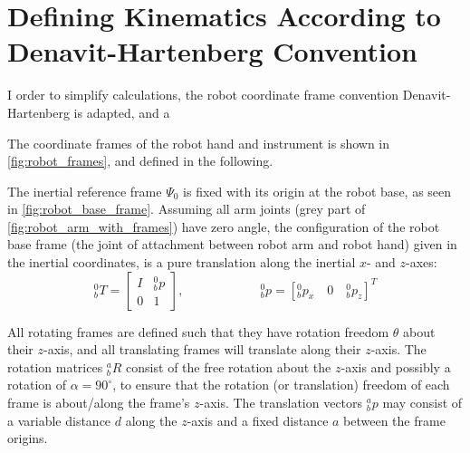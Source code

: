 \section{Defining Kinematics According to Denavit-Hartenberg Convention}

I order to simplify calculations, the robot coordinate frame convention Denavit-Hartenberg is adapted, and a 

The coordinate frames of the robot hand and instrument is shown in \autoref{fig:robot_frames}, and defined in the following.


The inertial reference frame $\Psi_0$ is fixed with its origin at the robot base, as seen in \autoref{fig:robot_base_frame}. Assuming all arm joints (grey part of \autoref{fig:robot_arm_with_frames}) have zero angle, the configuration of the robot base frame (the joint of attachment between robot arm and robot hand) given in the inertial coordinates, is a pure translation along the inertial $x$- and $z$-axes:
\begin{equation}
^0_b T = \begin{bmatrix}
I & ^0_bp\\
0 & 1
\end{bmatrix}, 
\qquad\qquad\qquad
^0_bp = [^0_bp_x \quad 0 \quad ^0_bp_z]^T
\end{equation}

All rotating frames are defined such that they have rotation freedom $\theta$ about their $z$-axis, and all translating frames will translate along their $z$-axis. The rotation matrices $^a_bR$ consist of the free rotation about the $z$-axis and possibly a rotation of $\alpha=90^\circ$, to ensure that the rotation (or translation) freedom of each frame is about/along the frame's $z$-axis. The translation vectors $^a_bp$ may consist of a variable distance $d$ along the $z$-axis and a fixed distance $a$ between the frame origins.


